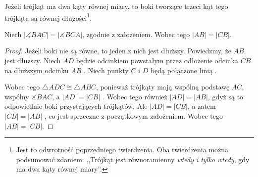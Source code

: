 \documentclass[12pt, a4paper]{scrartcl}
\begin{document}
\begin{theorem}
  Jeżeli trójkąt ma dwa kąty równej miary, to boki tworzące trzeci kąt tego
  trójkąta są równej długości\footnote{
      Jest to odwrotność poprzedniego twierdzenia. Oba twierdzenia można
      podsumować zdaniem: ,,Trójkąt jest równoramienny \emph{wtedy i tylko
      wtedy}, gdy ma dwa kąty równej miary''.
  }.

  \begin{figure}[!h]
      \begin{center}
      \end{center}
  \end{figure}

Niech \(|\measuredangle BAC| = |\measuredangle BCA|\), zgodnie z założeniem.
Wobec tego \(|AB| = |CB|\).

\begin{proof}
    Jeżeli boki nie są równe, to jeden z nich jest dłuższy. Powiedzmy, że \(AB\)
    jest dłuższy. Niech \(AD\) będzie odcinkiem powstałym przez odłożenie
    odcinka \(CB\) na dłuższym odcinku \(AB\) . Niech punkty \(C\) i
    \(D\) będą połączone linią .

    Wobec tego \(\triangle ADC \cong \triangle ABC\), ponieważ trójkąty mają
    wspólną podstawę \(AC\), wspólny \(\measuredangle BAC\), a \(|AD| = |CB|\)
    . Wobec tego również \(|AD| = |AB|\), gdyż są to odpowiednie boki
    przystających trójkątów. Ale \(|AD| = |CB|\), a zatem \(|CB| = |AB|\)
    , co jest sprzeczne z początkowym założeniem. Wobec tego
    \(|AB| = |CB|\).
\end{proof}
\end{theorem}
\end{document}
